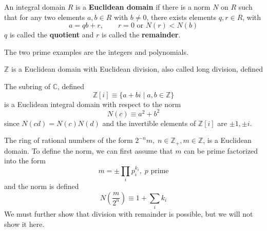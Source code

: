   \begin{definition}
    An integral domain $R$ is a \textbf{Euclidean domain} if there is a norm $N$ on $R$ such that for any two elements $a, b \in R$ with $b \neq 0$, there exists elements $q, r \in R$, with 
    \begin{equation}
      a = qb + r, \qquad r = 0 \text{ or } N(r) < N(b) 
    \end{equation}
    $q$ is called the \textbf{quotient} and $r$ is called the \textbf{remainder}. 
  \end{definition}

  The two prime examples are the integers and polynomials. 

  \begin{example}[Integers]
    $\mathbb{Z}$ is a Euclidean domain with Euclidean division, also called long division, defined 

    \begin{center}
    \end{center}
  \end{example}

  \begin{example}
    The subring of $\mathbb{C}$, defined
    \begin{equation}
      \mathbb{Z}[i] \equiv \{ a + b i \mid a, b \in \mathbb{Z} \}
    \end{equation}
    is a Euclidean integral domain with respect to the norm 
    \begin{equation}
      N(c) \equiv a^2 + b^2
    \end{equation}
    since $N(c d) = N(c) N(d)$ and the invertible elements of $\mathbb{Z}[i]$ are $\pm 1, \pm i$. 
  \end{example}

  \begin{example}
    The ring of rational numbers of the form $2^{-n} m, \; n \in \mathbb{Z}_+, m \in \mathbb{Z}$, is a Euclidean domain. To define the norm, we can first assume that $m$ can be prime factorized into the form 
    \begin{equation}
      m = \pm \prod_{i} p_{i}^{k_i}, \; p \text{ prime}
    \end{equation}
    and the norm is defined 
    \begin{equation}
      N(\frac{m}{2^n}) \equiv 1 + \sum_i k_i
    \end{equation}
    We must further show that division with remainder is possible, but we will not show it here. 
  \end{example}

